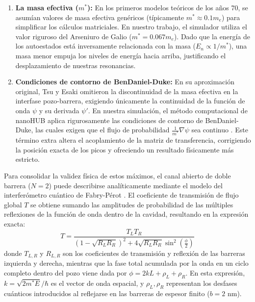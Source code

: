 \documentclass[a4paper,12pt]{article}
\begin{document}
\begin{enumerate}
    \item \textbf{La masa efectiva ($m^*$):} En los primeros modelos teóricos de los años 70, se asumían valores de masa efectiva genéricos (típicamente $m^* \approx 0.1 m_e$) para simplificar los cálculos matriciales. En nuestro trabajo, el simulador utiliza el valor riguroso del Arseniuro de Galio ($m^* = 0.067 m_e$). Dado que la energía de los autoestados está inversamente relacionada con la masa ($E_n \propto 1/m^*$), una masa menor empuja los niveles de energía hacia arriba, justificando el desplazamiento de nuestras resonancias.
    \item \textbf{Condiciones de contorno de BenDaniel-Duke:} En su aproximación original, Tsu y Esaki omitieron la discontinuidad de la masa efectiva en la interfase pozo-barrera, exigiendo únicamente la continuidad de la función de onda $\psi$ y su derivada $\psi'$. En nuestra simulación, el método computacional de nanoHUB aplica rigurosamente las condiciones de contorno de BenDaniel-Duke, las cuales exigen que el flujo de probabilidad $\frac{1}{m^*}\nabla\psi$ sea continuo \cite{BenDaniel1966}. Este término extra altera el acoplamiento de la matriz de transferencia, corrigiendo la posición exacta de los picos y ofreciendo un resultado físicamente más estricto.
\end{enumerate}

Para consolidar la validez física de estos máximos, el canal abierto de doble barrera ($N=2$) puede describirse analíticamente mediante el modelo del interferómetro cuántico de Fabry-Pérot \cite{bastard1991}. El coeficiente de transmisión de flujo global $T$ se obtiene sumando las amplitudes de probabilidad de las múltiples reflexiones de la función de onda dentro de la cavidad, resultando en la expresión exacta:
\begin{equation}
T = \frac{T_L T_R}{(1 - \sqrt{R_L R_R})^2 + 4\sqrt{R_L R_R}\sin^2\left(\frac{\phi}{2}\right)}
\end{equation}
donde $T_{L,R}$ y $R_{L,R}$ son los coeficientes de transmisión y reflexión de las barreras izquierda y derecha, mientras que la fase total acumulada por la onda en un ciclo completo dentro del pozo viene dada por $\phi = 2kL + \rho_L + \rho_R$. En esta expresión, $k = \sqrt{2m^*E}/\hbar$ es el vector de onda espacial, y $\rho_L, \rho_R$ representan los desfases cuánticos introducidos al reflejarse en las barreras de espesor finito ($b=2\text{ nm}$).
\end{document}
